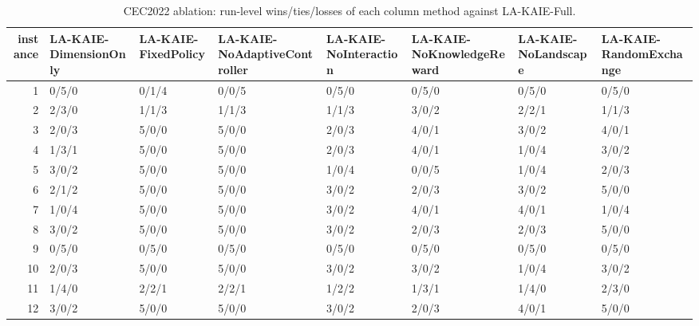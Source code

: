 \begin{table}[t]
\centering
\scriptsize
\caption{CEC2022 ablation: run-level wins/ties/losses of each column method against LA-KAIE-Full.}
\label{tab:cec2022_ablation_wtl}
\begin{tabular}{rlllllll}
\toprule
instance & LA-KAIE-DimensionOnly & LA-KAIE-FixedPolicy & LA-KAIE-NoAdaptiveController & LA-KAIE-NoInteraction & LA-KAIE-NoKnowledgeReward & LA-KAIE-NoLandscape & LA-KAIE-RandomExchange \\
\midrule
1 & 0/5/0 & 0/1/4 & 0/0/5 & 0/5/0 & 0/5/0 & 0/5/0 & 0/5/0 \\
2 & 2/3/0 & 1/1/3 & 1/1/3 & 1/1/3 & 3/0/2 & 2/2/1 & 1/1/3 \\
3 & 2/0/3 & 5/0/0 & 5/0/0 & 2/0/3 & 4/0/1 & 3/0/2 & 4/0/1 \\
4 & 1/3/1 & 5/0/0 & 5/0/0 & 2/0/3 & 4/0/1 & 1/0/4 & 3/0/2 \\
5 & 3/0/2 & 5/0/0 & 5/0/0 & 1/0/4 & 0/0/5 & 1/0/4 & 2/0/3 \\
6 & 2/1/2 & 5/0/0 & 5/0/0 & 3/0/2 & 2/0/3 & 3/0/2 & 5/0/0 \\
7 & 1/0/4 & 5/0/0 & 5/0/0 & 3/0/2 & 4/0/1 & 4/0/1 & 1/0/4 \\
8 & 3/0/2 & 5/0/0 & 5/0/0 & 3/0/2 & 2/0/3 & 2/0/3 & 5/0/0 \\
9 & 0/5/0 & 0/5/0 & 0/5/0 & 0/5/0 & 0/5/0 & 0/5/0 & 0/5/0 \\
10 & 2/0/3 & 5/0/0 & 5/0/0 & 3/0/2 & 3/0/2 & 1/0/4 & 3/0/2 \\
11 & 1/4/0 & 2/2/1 & 2/2/1 & 1/2/2 & 1/3/1 & 1/4/0 & 2/3/0 \\
12 & 3/0/2 & 5/0/0 & 5/0/0 & 3/0/2 & 2/0/3 & 4/0/1 & 5/0/0 \\
\bottomrule
\end{tabular}
\end{table}
